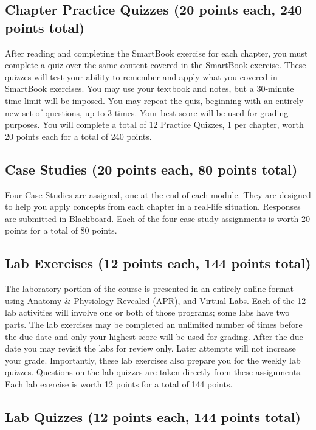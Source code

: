 \subsection*{Chapter Practice Quizzes (20 points each, 240 points total)}

After reading and completing the SmartBook exercise for each chapter, you must complete a quiz over the same content covered in the SmartBook exercise. These quizzes will test your ability to remember and apply what you covered in SmartBook exercises. You may use your textbook and notes, but a 30-minute time limit will be imposed. You may repeat the quiz, beginning with an entirely new set of questions, up to 3 times. Your best score will be used for grading purposes. You will complete a total of 12 Practice Quizzes, 1 per chapter, worth 20 points each for a total of 240 points.

\subsection*{Case Studies (20 points each, 80 points total)}

Four Case Studies are assigned, one at the end of each module. They are designed to help you apply concepts from each chapter in a real-life situation. Responses are submitted in Blackboard. Each of the four case study assignments is worth 20 points for a total of 80 points.

\subsection*{Lab Exercises (12 points each, 144 points total)}

The laboratory portion of the course is presented in an entirely online format using Anatomy \& Physiology Revealed (APR), and Virtual Labs. Each of the 12 lab activities will involve one or both of those programs; some labs have two parts. The lab exercises may be completed an unlimited number of times before the due date and only your highest score will be used for grading. After the due date you may revisit the labs for review only. Later attempts will not increase your grade. Importantly, these lab exercises also prepare you for the weekly lab quizzes. Questions on the lab quizzes are taken directly from these assignments. Each lab exercise is worth 12 points for a total of 144 points.

\subsection*{Lab Quizzes (12 points each, 144 points total)}

